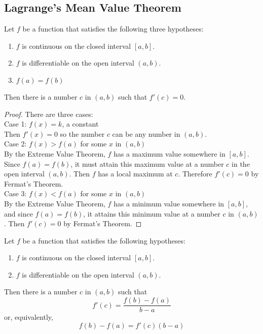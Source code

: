 \subsection{Lagrange's Mean Value Theorem}

\begin{theorem}
    Let \(f\) be a function that satisfies the following three hypotheses:
    \begin{enumerate}
        \item \(f\) is continuous on the closed interval \([a,b]\).
        \item \(f\) is differentiable on the open interval \((a,b)\).
        \item \(f(a)=f(b)\)
    \end{enumerate}
    Then there is a number \(c\) in \((a,b)\) such that \(f'(c)=0\).
\end{theorem}
\begin{proof}
    There are three cases: \\
    Case 1: \(f(x)=k\), a constant \\
    Then \(f'(x)=0\) so the number \(c\) can be any number in \((a,b)\). \\
    Case 2: \(f(x)>f(a)\) for some \(x\) in \((a,b)\) \\
    By the Extreme Value Theorem, \(f\) has a maximum value somewhere in
    \([a,b]\).
    Since \(f(a)=f(b)\), it must attain this maximum value at a number \(c\)
    in the open interval \((a,b)\).
    Then \(f\) has a local maximum at \(c\).
    Therefore \(f'(c)=0\) by Fermat's Theorem. \\
    Case 3: \(f(x)<f(a)\) for some \(x\) in \((a,b)\) \\
    By the Extreme Value Theorem, \(f\) has a minimum value somewhere in
    \([a,b]\), and since \(f(a)=f(b)\), it attains this minimum value at a
    number \(c\) in \((a,b)\).
    Then \(f'(c)=0\) by Fermat's Theorem.
\end{proof}
\begin{theorem}
    Let \(f\) be a function that satisfies the following hypotheses:
    \begin{enumerate}
        \item \(f\) is continuous on the closed interval \([a,b]\).
        \item \(f\) is differentiable on the open interval \((a,b)\).
    \end{enumerate}
    Then there is a number \(c\) in \((a,b)\) such that
    \[f'(c)=\frac{f(b)-f(a)}{b-a}\]
    or, equivalently,
    \[f(b)-f(a)=f'(c)(b-a)\]
\end{theorem}

